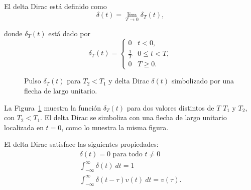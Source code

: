 \documentclass[paper=letter, fontsize=11pt]{scrartcl}
\begin{document}
\begin{defi} El delta Dirac está definido como
  \begin{equation}
    \delta(t) = \lim_{T \to 0} \delta_T(t),
  \end{equation}
\end{defi}
%
donde $\delta_T(t)$ está dado por
%
\begin{equation}
  \delta_T(t) =
  \begin{cases}
    0 & t < 0,\\
    \frac{1}{T} & 0 \leq t < T,\\
    0 & T \geq 0.
  \end{cases}
\end{equation}

\begin{figure}[h!]
  \centering
  \caption{Pulso $\delta_T(t)$ para $T_2 < T_1$ y delta Dirac $\delta(t)$
    simbolizado por una flecha de largo unitario.}
\label{fig:dirac}
\end{figure}

La Figura~\ref{fig:dirac} muestra la función $\delta_T(t)$ para dos valores
distintos de $T$ $T_1$ y $T_2$, con $T_2 < T_1$. El delta Dirac se simboliza
con una flecha de largo unitario localizada en $t=0$, como lo muestra la misma
figura.

El delta Dirac satisface las siguientes propiedades:
%
\begin{gather}
  \delta(t) = 0 \text{ para todo } t \neq 0 \\
  \int_{-\infty}^\infty \delta(t) \ dt = 1 \\
  \int_{-\infty}^\infty \delta(t - \tau) v(t) \ dt = v(\tau).
\end{gather}
\end{document}
